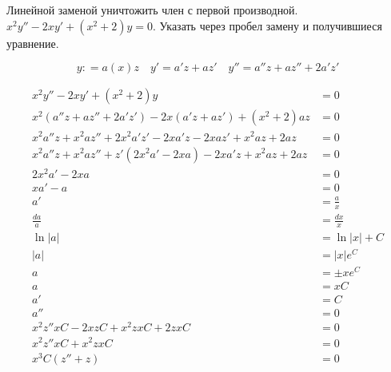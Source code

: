 

\cfoot{}



\section{}

Линейной заменой уничтожить член с первой производной. \(x^2y''-2xy'+(x^2+2)y=0\). Указать через пробел замену и получившиеся уравнение.

\[
    y : = a(x) z \quad y' = a'z + az' \quad y'' = a''z + az'' + 2a'z'
\]

\begin{align*}
    x^2y''-2xy'+(x^2+2)y\,                                     & = 0            \\
    x^2(a''z + az'' + 2a'z') - 2x(a'z + az') + (x^2+2) az      & = 0            \\
    x^2a''z + x^2az'' + 2x^2a'z' - 2xa'z - 2xaz' + x^2az + 2az & = 0            \\
    x^2a''z + x^2az'' + z'(2x^2a' - 2xa) - 2xa'z + x^2az + 2az & = 0            \\
    2x^2 a' - 2xa                                              & = 0            \\
    x a' - a                                                   & = 0            \\
    a'                                                         & = \frac{a}{x}  \\
    \frac{da}{a}                                               & = \frac{dx}{x} \\
    \ln|a|                                                     & = \ln|x| + C   \\
    |a|                                                        & = |x|e^C       \\
    a                                                          & = \pm xe^C     \\
    a                                                          & = xC           \\
    a'                                                         & = C            \\
    a''                                                        & = 0            \\
    x^2z''xC - 2xzC + x^2zxC + 2zxC                            & = 0            \\
    x^2z''xC + x^2zxC                                          & = 0            \\
    x^3C(z'' + z)                                              & = 0            \\
\end{align*}

